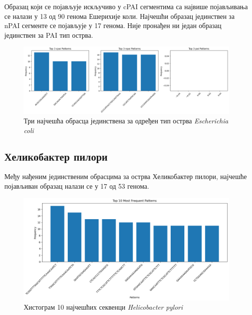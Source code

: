 \documentclass[12pt]{article}
\begin{document}
\newpage

Образац који се појављује искључиво у cPAI сегментима са највише појављивања се налази у 13 од 90 генома Ешерихије коли. Најчешћи образац јединствен за nPAI сегменте се појављује у 17 генома. Није пронађен ни један образац јединствен за PAI тип острва.

\begin{figure}[htbp]
    \centering
    \vspace{0.2cm}
    \includegraphics[width=\linewidth]{images/top_3_by_islands.png}
    \caption{Три најчешћа обрасца јединствена за одређен тип острва \textit{Escherichia coli}}
    \label{fig:top3_by_islands}
\end{figure}

\subsection{Хеликобактер пилори}

Међу нађеним јединственим обрасцима за острва Хеликобактер пилори, најчешће појављиван образац налази се у 17 од 53 генома.

\begin{figure}[htbp]
    \centering
    \vspace{0.2cm}
    \includegraphics[width=\linewidth]{images/top_10_hist_h_pylori.png}
    \caption{Хистограм 10 најчешћих секвенци \textit{Helicobacter pylori}}
    \label{fig:top10histhpylori}
\end{figure}
\end{document}
